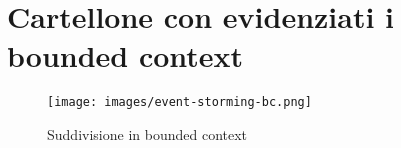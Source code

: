 \chapter{Cartellone con evidenziati i bounded context}
\label{app:cartellone-event-storming-bc}

\begin{figure}[!ht]
  \centering
  \texttt{[image: images/event-storming-bc.png]}
  \caption{Suddivisione in bounded context}
  \label{fig:seconda-riunione-bc}
\end{figure}